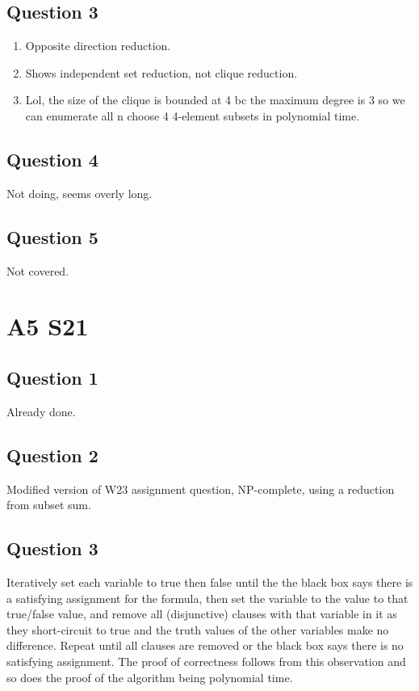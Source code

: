 \documentclass[11pt]{article}
\begin{document}
\subsection{Question 3}

\begin{enumerate}
    \item Opposite direction reduction.
    \item Shows independent set reduction, not clique reduction.
    \item Lol, the size of the clique is bounded at 4 bc the maximum degree is 3 so we can enumerate all n choose 4 4-element subsets in polynomial time.
\end{enumerate}

\subsection{Question 4}

Not doing, seems overly long.

\subsection{Question 5}

Not covered.

\section{A5 S21}

\subsection{Question 1}

Already done.

\subsection{Question 2}

Modified version of W23 assignment question, NP-complete, using a reduction from subset sum.

\subsection{Question 3}

Iteratively set each variable to true then false until the the black box says there is a satisfying assignment for the formula, then set the variable to the value to that true/false value, and remove all (disjunctive) clauses with that variable in it as they short-circuit to true and the truth values of the other variables make no difference. Repeat until all clauses are removed or the black box says there is no satisfying assignment. The proof of correctness follows from this observation and so does the proof of the algorithm being polynomial time.
\end{document}
